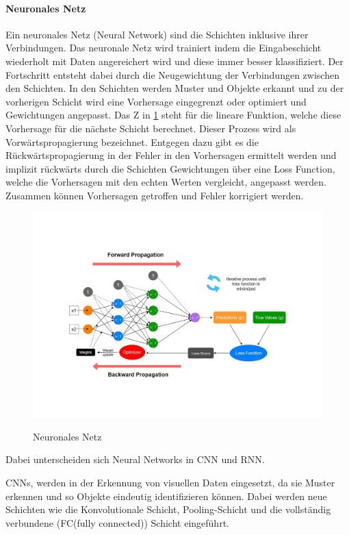 \paragraph{Neuronales Netz}
Ein neuronales Netz (Neural Network) sind die Schichten inklusive ihrer Verbindungen.
Das neuronale Netz wird trainiert indem die Eingabeschicht 
wiederholt mit Daten angereichert wird und diese immer besser klassifiziert.
Der Fortschritt entsteht dabei durch die Neugewichtung der Verbindungen 
zwischen den Schichten. 
In den Schichten werden Muster und Objekte erkannt und zu der vorherigen Schicht
wird eine Vorhersage eingegrenzt oder optimiert 
und Gewichtungen angepasst. 
Das Z in \ref{fig:NN} steht für die lineare Funktion, 
welche diese Vorhersage für die nächste Schicht berechnet.
Dieser Prozess wird als 
Vorwärtspropagierung bezeichnet. 
Entgegen dazu gibt es die Rückwärtspropagierung 
in der Fehler in den Vorhersagen ermittelt werden 
und implizit rückwärts durch die Schichten 
Gewichtungen über eine Loss Function, 
welche die Vorhersagen mit den echten Werten vergleicht, 
angepasst werden. 
Zusammen können Vorhersagen getroffen und Fehler korrigiert werden.
\begin{figure}[htb]
    \centering
    \includegraphics[width=\textwidth]{img/NeuralNetwork.pdf}\\
    \caption{ Neuronales Netz \cite{pramodithaOverviewNeuralNetwork2022a}}\label{fig:NN}
\end{figure}

  
Dabei unterscheiden sich Neural Networks in 
\gls{CNN} und \gls{RNN}.

CNNs, 
werden in der Erkennung von visuellen Daten eingesetzt, 
da sie Muster erkennen und so Objekte eindeutig identifizieren können.
Dabei werden neue Schichten wie die Konvolutionale Schicht, Pooling-Schicht und
die vollständig verbundene (FC(fully connected)) Schicht eingeführt. 
\cite{WasSindKonvolutionale2021}

